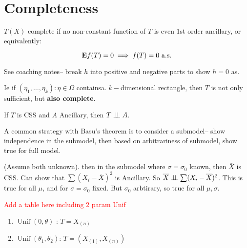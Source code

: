 \documentclass{article}
\newcommand\myworries[1]{\textcolor{red}{#1}}
\newcommand{\Unif}{\operatorname{Unif}}
\begin{document}
\section{Completeness} 
\begin{definition}[Completeness]
$T(X)$ complete if no non-constant function of $T$ is even 1st order ancillary, or equivalently:

$$\mathbf{E} f(T) = 0 \implies f(T) = 0 \text{ a.s}.$$
\end{definition}
\begin{example}[$X_i\sim\Unif(0,\theta)$]
See coaching notes-- break $h$ into positive and negative parts to show $h = 0$ as. 	
\end{example}
\begin{theorem}
Ie if $(\eta_1,\ldots, \eta_k): \eta \in \Omega$ containsa. $k-$dimensional rectangle, then $T$ is not only sufficient, but \textbf{also complete}.
\end{theorem}
\begin{theorem}
If $T$ is CSS and $A$ Ancillary, then $T\perp \! \! \! \perp A$. 
\end{theorem}
A common strategy with Basu's theorem is to consider a submodel-- show independence in the submodel, then based on arbitrariness of submodel, show true for full model. 
\begin{example}
(Assume both unknown). then in the submodel where $\sigma = \sigma_0$ known, then $\bar X$ is CSS. Can show that $\sum (X_i - \bar X)^2$ is Ancillary. So $\overline X \perp \! \! \! \perp \sum (X_i - \overline X)^2$. This is true for all $\mu$, and for $\sigma = \sigma_0$ fixed. But $\sigma_0$ arbtirary, so true for all $\mu,\sigma$. 	
\end{example}
\myworries{Add a table here including 2 param Unif}
\begin{enumerate}
	\item $\Unif(0,\theta)$ : $T= X_{(n)}$
	\item $\Unif(\theta_1, \theta_2)$: $T = (X_{(1)}, X_{(n)})$
\end{enumerate}
\end{document}
